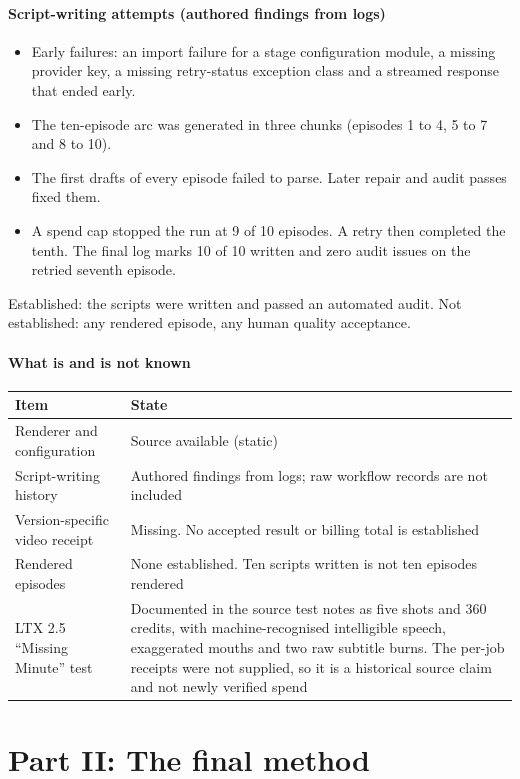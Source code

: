 \documentclass[11pt,a4paper]{article}
\begin{document}
\subsection{Script-writing attempts (authored findings from logs)}
\begin{itemize}
\item Early failures: an import failure for a stage configuration module, a missing provider key, a missing retry-status exception class and a streamed response that ended early.
\item The ten-episode arc was generated in three chunks (episodes 1 to 4, 5 to 7 and 8 to 10).
\item The first drafts of every episode failed to parse. Later repair and audit passes fixed them.
\item A spend cap stopped the run at 9 of 10 episodes. A retry then completed the tenth. The final log marks 10 of 10 written and zero audit issues on the retried seventh episode.
\end{itemize}
Established: the scripts were written and passed an automated audit. Not established: any rendered episode, any human quality acceptance.

\subsection{What is and is not known}
\begin{longtable}{@{}P{4.6cm}P{10.9cm}@{}}
\toprule \textbf{Item} & \textbf{State}\\ \midrule\endhead
Renderer and configuration & Source available (static)\\
Script-writing history & Authored findings from logs; raw workflow records are not included\\
Version-specific video receipt & Missing. No accepted result or billing total is established\\
Rendered episodes & None established. Ten scripts written is not ten episodes rendered\\
LTX 2.5 ``Missing Minute'' test & Documented in the source test notes as five shots and 360 credits, with machine-recognised intelligible speech, exaggerated mouths and two raw subtitle burns. The per-job receipts were not supplied, so it is a historical source claim and not newly verified spend\\
\bottomrule
\end{longtable}

\part*{Part II: The final method}
\end{document}
